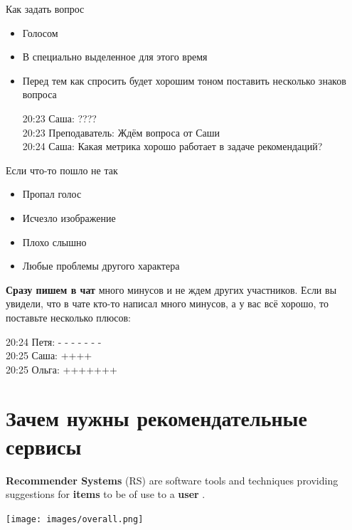 \documentclass[11pt,aspectratio=169,handout]{beamer}
\begin{document}
\begin{frame}{Как задать вопрос}

\begin{itemize}
\item Голосом
\item В специально выделенное для этого время
\item Перед тем как спросить будет хорошим тоном поставить несколько знаков вопроса
\begin{tcolorbox}[colback=gray!5,colframe=gray!80,title=]
20:23 Саша: ???? \\
20:23 Преподаватель: Ждём вопроса от Саши \\
20:24 Саша: Какая метрика хорошо работает в задаче рекомендаций?
\end{tcolorbox}
\end{itemize}

\end{frame}

\begin{frame}{Если что-то пошло не так}

\begin{itemize}
\item Пропал голос
\item Исчезло изображение
\item Плохо слышно
\item Любые проблемы другого характера
\end{itemize}
\vfill
{\bf Сразу пишем в чат} много минусов и не ждем других участников. Если вы увидели, что в чате кто-то написал много минусов, а у вас всё хорошо, то поставьте несколько плюсов:
\vfill
\begin{tcolorbox}[colback=gray!5,colframe=gray!80,title=]
20:24 Петя: - - - - - - -  \\
20:25 Саша: ++++ \\
20:25 Ольга: +++++++
\end{tcolorbox}

\end{frame}

\section{Зачем нужны рекомендательные сервисы}

\begin{frame}{}

\vfill
\begin{tcolorbox}[colback=info!5,colframe=info!80,title=]
{\bf Recommender Systems} (RS) are software tools and techniques providing suggestions for {\bf items} to be of use to a {\bf user} \cite{RSHB}.
\end{tcolorbox}
\vfill
\begin{center}
\texttt{[image: images/overall.png]}
\end{center}

\end{frame}
\end{document}
